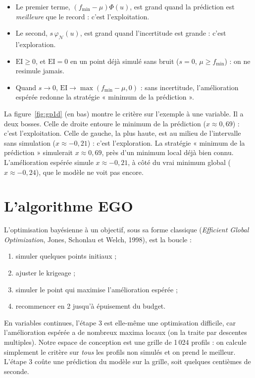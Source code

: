 \begin{resultat}
\begin{itemize}
\item Le premier terme, $(f_{\min}-\mu)\Phi(u)$, est grand quand la prédiction est \emph{meilleure} que le record : c'est l'exploitation.
\item Le second, $s\,\varphi_{\mathcal N}(u)$, est grand quand l'incertitude est grande : c'est l'exploration.
\item $\mathrm{EI}\ge0$, et $\mathrm{EI}=0$ en un point déjà simulé sans bruit ($s=0$, $\mu\ge f_{\min}$) : on ne resimule jamais.
\item Quand $s\to0$, $\mathrm{EI}\to\max(f_{\min}-\mu,0)$ : sans incertitude, l'amélioration espérée redonne la stratégie « minimum de la prédiction ».
\end{itemize}
\end{resultat}

La figure~\ref{fig:gp1d} (en bas) montre le critère sur l'exemple à une variable. Il a deux bosses. Celle de droite entoure le minimum de la prédiction ($x\approx0{,}69$) : c'est l'exploitation. Celle de gauche, la plus haute, est au milieu de l'intervalle sans simulation ($x\approx-0{,}21$) : c'est l'exploration. La stratégie « minimum de la prédiction » simulerait $x\approx0{,}69$, près d'un minimum local déjà bien connu. L'amélioration espérée simule $x\approx-0{,}21$, à côté du vrai minimum global ($x\approx-0{,}24$), que le modèle ne voit pas encore.

\section{L'algorithme EGO}
L'optimisation bayésienne à un objectif, sous sa forme classique (\emph{Efficient Global Optimization}, Jones, Schonlau et Welch, 1998), est la boucle :
\begin{enumerate}
\item simuler quelques points initiaux ;
\item ajuster le krigeage ;
\item simuler le point qui maximise l'amélioration espérée ;
\item recommencer en 2 jusqu'à épuisement du budget.
\end{enumerate}

\begin{projet}
En variables continues, l'étape 3 est elle-même une optimisation difficile, car l'amélioration espérée a de nombreux maxima locaux (on la traite par descentes multiples). Notre espace de conception est une grille de 1\,024 profils : on calcule simplement le critère sur \emph{tous} les profils non simulés et on prend le meilleur. L'étape 3 coûte une prédiction du modèle sur la grille, soit quelques centièmes de seconde.
\end{projet}

